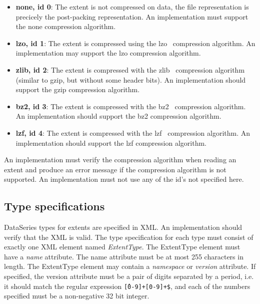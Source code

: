 \begin{itemize}

\item {\bf none, id 0}: The extent is not compressed on data, the file
  representation is precicely the post-packing representation.  An
  implementation must support the none compression algorithm.

\item {\bf lzo, id 1}: The extent is compressed using the
  lzo~\cite{LZO} compression algorithm.  An implementation may support
  the lzo compression algorithm.

\item {\bf zlib, id 2}: The extent is compressed with the
  zlib~\cite{GZIP} compression algorithm (similar to gzip, but without
  some header bits).  An implementation should support the gzip
  compression algorithm.

\item {\bf bz2, id 3}: The extent is compressed with the
  bz2~\cite{BZIP} compression algorithm.  An implementation should
  support the bz2 compression algorithm.

\item {\bf lzf, id 4}: The extent is compressed with the
  lzf~\cite{LZF} compression algorithm.  An implementation should
  support the lzf compression algorithm.

\end{itemize}

An implementation must verify the compression algorithm when reading
an extent and produce an error message if the compression algorithm is
not supported.  An implementation must not use any of the id's not
specified here.

\subsection{Type specifications}

DataSeries types for extents are specified in XML.  An implementation should
verify that the XML is valid.  The type specification for each type must
consist of exactly one XML element named {\it ExtentType}.  The ExtentType
element must have a {\it name} attribute.  The name attribute must be at most
255 characters in length.  The ExtentType element may contain a {\it namespace}
or {\it version} attribute.  If specified, the version attribute must be a pair
of digits separated by a period, i.e. it should match the regular expression
\texttt{\^[0-9]+\.[0-9]+\$}, and each of the numbers specified must be a
non-negative 32 bit integer.


